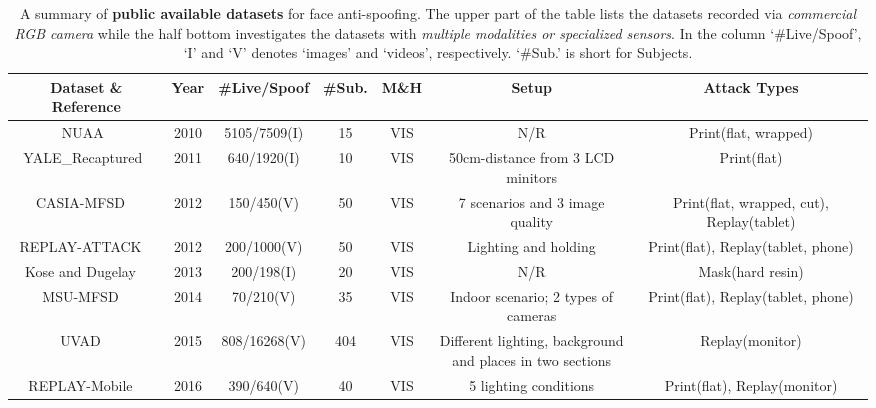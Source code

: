 \documentclass[10pt,journal,compsoc]{IEEEtran}
\begin{document}
\begin{table}
\centering
\caption{A summary of \textbf{public available datasets} for face anti-spoofing. The upper part of the table lists the datasets recorded via \textit{commercial RGB camera} while the half bottom investigates the datasets with \textit{multiple modalities or specialized sensors}. In the column `\#Live/Spoof', `I' and `V' denotes `images' and `videos', respectively. `\#Sub.' is short for Subjects.} \label{tab:dataset}
\resizebox{1.0\textwidth}{!} {\begin{tabular}{c c c c c c c} 
 \toprule[1pt]
 Dataset \& Reference & Year & \#Live/Spoof & \#Sub. & M\&H & Setup & Attack Types \\
 \midrule
 NUAA~\cite{tan2010face} & 2010 & 5105/7509(I) & 15  & VIS & N/R & Print(flat, wrapped)\\

 \midrule
 YALE\_Recaptured~\cite{peixoto2011face} & 2011 & 640/1920(I) & 10  & VIS & 50cm-distance from 3 LCD minitors & Print(flat)\\

 \midrule
 CASIA-MFSD
~\cite{Zhang2012A} & 2012 & 150/450(V) & 50 & VIS & 7 scenarios and 3 image quality & Print(flat, wrapped, cut), Replay(tablet)\\

 \midrule
REPLAY-ATTACK
~\cite{ReplayAttack} & 2012 & 200/1000(V) & 50 & VIS &  Lighting and holding  & Print(flat), Replay(tablet, phone)\\


 \midrule
Kose and Dugelay
~\cite{kose2013shape} & 2013 & 200/198(I) & 20 & VIS &  N/R  & Mask(hard resin)\\



 \midrule
MSU-MFSD
~\cite{wen2015face} & 2014 & 70/210(V) & 35 & VIS &  Indoor scenario; 2 types of cameras & Print(flat), Replay(tablet, phone)\\



 \midrule
UVAD
~\cite{pinto2015using} & 2015 & 808/16268(V) & 404 & VIS &  \tabincell{c}{Different lighting, background \\and places in two sections}  & Replay(monitor)\\

 \midrule
REPLAY-Mobile
~\cite{costa2016replay} & 2016 & 390/640(V) & 40 & VIS &  5 lighting conditions & Print(flat), Replay(monitor)\\


\end{tabular}}
\end{table}
\end{document}
